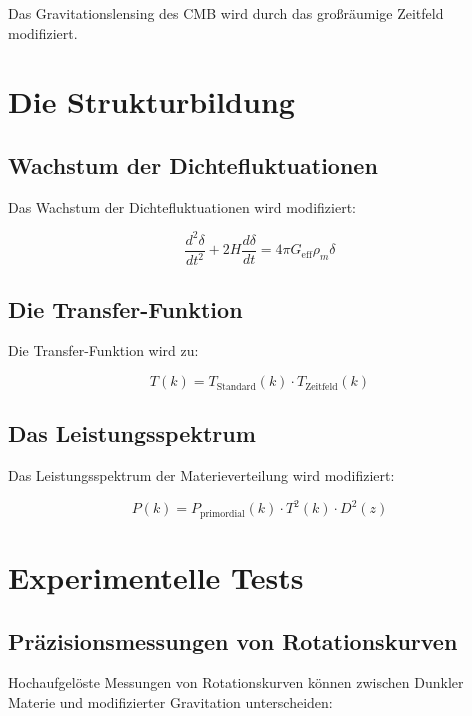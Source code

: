 \documentclass[12pt,a4paper]{report}
\begin{document}
	Das Gravitationslensing des CMB wird durch das großräumige Zeitfeld modifiziert.
	
	\section{Die Strukturbildung}
	
	\subsection{Wachstum der Dichtefluktuationen}
	
	Das Wachstum der Dichtefluktuationen wird modifiziert:
	
	\begin{equation}
		\frac{d^2\delta}{dt^2} + 2H\frac{d\delta}{dt} = 4\pi G_{\text{eff}}\rho_m\delta
	\end{equation}
	
	\subsection{Die Transfer-Funktion}
	
	Die Transfer-Funktion wird zu:
	
	\begin{equation}
		T(k) = T_{\text{Standard}}(k) \cdot T_{\text{Zeitfeld}}(k)
	\end{equation}
	
	\subsection{Das Leistungsspektrum}
	
	Das Leistungsspektrum der Materieverteilung wird modifiziert:
	
	\begin{equation}
		P(k) = P_{\text{primordial}}(k) \cdot T^2(k) \cdot D^2(z)
	\end{equation}
	
	\section{Experimentelle Tests}
	
	\subsection{Präzisionsmessungen von Rotationskurven}
	
	Hochaufgelöste Messungen von Rotationskurven können zwischen Dunkler Materie und modifizierter Gravitation unterscheiden:
	
\end{document}
